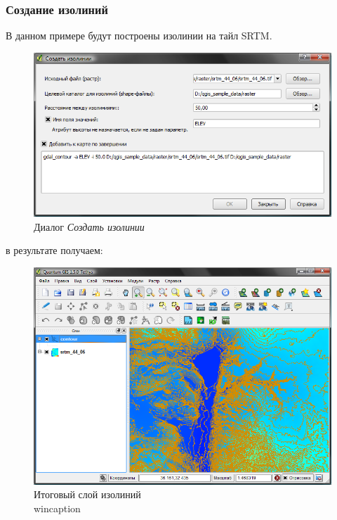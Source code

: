 {\subsubsection{Создание изолиний}
В данном примере будут построены изолинии на тайл SRTM.
\begin{figure}[ht]
   \centering
   \includegraphics[clip=true, width=12cm]{plugins_gdaltools_images/gdal_contour}
   \caption{\label{gdal_contour} Диалог \emph{Создать изолинии} \wincaption}
\end{figure}
в результате получаем:
\begin{figure}[ht]
   \centering
   \includegraphics[clip=true, width=12cm]{plugins_gdaltools_images/qgis_contours}
   \caption{\label{gdal_contour} Итоговый слой изолиний \\wincaption}
\end{figure}

}
